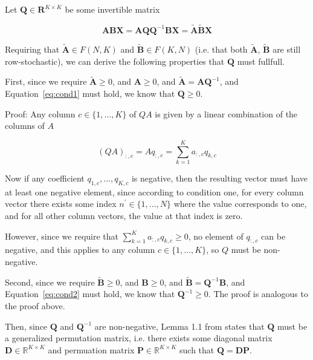 \documentclass[oneside]{article}
\begin{document}

Let $\mathbf{Q} \in \mathbf{R}^{K \times K}$ be some invertible matrix

\begin{equation}
    \mathbf{A} \mathbf{B} \mathbf{X} = \mathbf{A} \mathbf{Q} \mathbf{Q}^{-1} \mathbf{B} \mathbf{X} = \tilde{\mathbf{A}} \tilde{\mathbf{B}} \mathbf{X}
\end{equation}

Requiring that $\tilde{\mathbf{A}} \in F(N, K)$ and $\tilde{\mathbf{B}} \in F(K, N)$ (i.e. that both $\tilde{\mathbf{A}}$, $\tilde{\mathbf{B}}$ are still row-stochastic), we can derive the following properties that $\mathbf{Q}$ must fullfull.

First, since we require $\tilde{\mathbf{A}} \geq 0$, and $\mathbf{A} \geq 0$, and $\tilde{\mathbf{A}} = \mathbf{A} \mathbf{Q}^{-1}$, and Equation~\eqref{eq:cond1} must hold, we know that $\mathbf{Q} \geq 0$.

Proof: Any column $c \in \{1, ..., K\}$ of $Q A$ is given by a linear combination of the columns of $A$

\begin{equation}
    (Q A)_{:, c} = A q_{:, c} = \sum_{k = 1}^K a_{:, c} q_{k, c}
\end{equation}

Now if any coefficient $q_{1, c}, ..., q_{K, c}$ is negative, then the resulting vector must have at least one negative element, since according to condition one, for every column vector there exists some index $n^\prime \in \{1, ..., N\}$ where the value corresponds to one, and for all other column vectors, the value at that index is zero.

However, since we require that $\sum_{k = 1}^K a_{:, c} q_{k, c} \geq 0$, no element of $q_{:, c}$ can be negative, and this applies to any column $c \in \{1, ..., K\}$, so $Q$ must be non-negative.

Second, since we require $\tilde{\mathbf{B}} \geq 0$, and $\mathbf{B} \geq 0$, and $\tilde{\mathbf{B}} = \mathbf{Q}^{-1} \mathbf{B}$, and Equation~\eqref{eq:cond2} must hold, we know that $\mathbf{Q}^{-1} \geq 0$. The proof is analogous to the proof above.

Then, since $\mathbf{Q}$ and $\mathbf{Q}^{-1}$ are non-negative, Lemma 1.1 from \autocite{mincNonnegativeMatrices1988} states that $\mathbf{Q}$ must be a generalized permutation matrix, i.e. there exists some diagonal matrix $\mathbf{D} \in \mathbb{R}^{K \times K}$ and permuation matrix $\mathbf{P} \in \mathbb{R}^{K \times K}$ such that $\mathbf{Q} = \mathbf{D} \mathbf{P}$.
\end{document}
